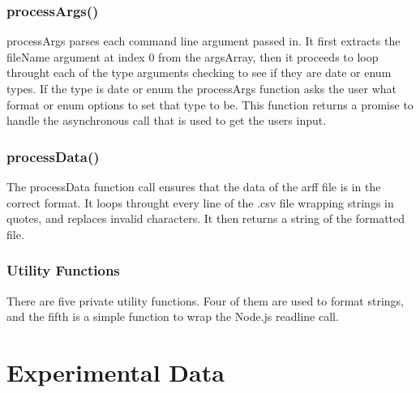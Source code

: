 \documentclass[11pt]{article} %
\begin{document}
\subsubsection{processArgs()}
processArgs parses each command line argument passed in. It first extracts the fileName argument at index 0 from the argsArray, then it proceeds to loop throught each of the type arguments checking to see if they are date or enum types. If the type is date or enum the processArgs function asks the user what format or enum options to set that type to be. This function returns a promise to handle the asynchronous call that is used to get the users input.

\subsubsection{processData()}
The processData function call ensures that the data of the arff file is in the correct format. It loops throught every line of the .csv file wrapping strings in quotes, and replaces invalid characters. It then returns a string of the formatted file.

\subsubsection{Utility Functions}
There are five private utility functions. Four of them are used to format strings, and the fifth is a simple function to wrap the Node.js readline call.

\section{Experimental Data}
\end{document}
